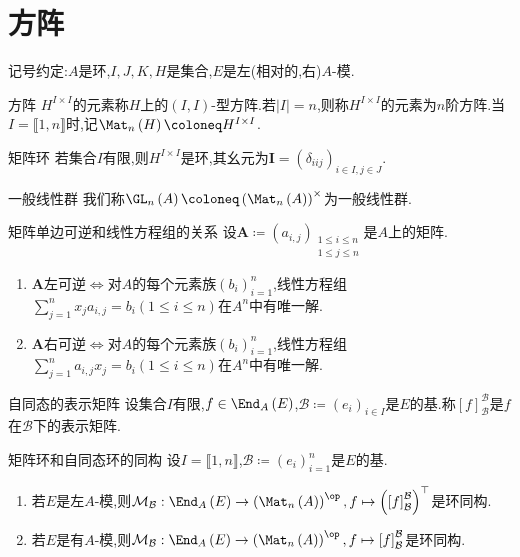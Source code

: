 \section{方阵}

记号约定:$A$是环,$I,J,K,H$是集合,$E$是左(相对的,右)$A$-模.

\begin{definition}{方阵}{}
	$H^{I\times I}$的元素称$H$上的$\left(I,I\right)$-型方阵.若$\left|I\right|=n$,则称$H^{I\times I}$的元素为$n$阶方阵.当$I=\llbracket 1,n\rrbracket$时,记$\Mat_{n}\left(H\right)\coloneq H^{I\times I}$.
\end{definition}

\begin{proposition}{矩阵环}{}
	若集合$I$有限,则$H^{I\times I}$是环,其幺元为$\boldsymbol{I}=\left(\delta_{iij}\right)_{i\in I,j\in J}$.
\end{proposition}

\begin{definition}{一般线性群}{}
	我们称$\GL_{n}\left(A\right)\coloneq\left(\Mat_{n}\left(A\right)\right)^{\times}$为一般线性群.
\end{definition}

\begin{proposition}{矩阵单边可逆和线性方程组的关系}{}
	设$\boldsymbol{A}\coloneq\left(a_{i,j}\right)_{\substack{1\leq i\leq n\\1\leq j\leq n}}$是$A$上的矩阵.
	\begin{enumerate}
		\item $\boldsymbol{A}$左可逆$\iff$对$A$的每个元素族$\left(b_{i}\right)_{i=1}^{n}$,线性方程组$\sum\limits_{j=1}^{n}x_{j}a_{i,j}=b_{i}\left(1\leq i\leq n\right)$在$A^{n}$中有唯一解.
		\item $\boldsymbol{A}$右可逆$\iff$对$A$的每个元素族$\left(b_{i}\right)_{i=1}^{n}$,线性方程组$\sum\limits_{j=1}^{n}a_{i,j}x_{j}=b_{i}\left(1\leq i\leq n\right)$在$A^{n}$中有唯一解.
	\end{enumerate}
\end{proposition}

\begin{definition}{自同态的表示矩阵}{}
	设集合$I$有限,$f\in\End_{A}\left(E\right)$,$\mathcal{B}\coloneq\left(e_{i}\right)_{i\in I}$是$E$的基.称$\left[f\right]_{\mathcal{B}}^{\mathcal{B}}$是$f$在$\mathcal{B}$下的表示矩阵.
\end{definition}

\begin{proposition}{矩阵环和自同态环的同构}{}
	设$I=\llbracket 1,n\rrbracket$,$\mathcal{B}\coloneq\left(e_{i}\right)_{i=1}^{n}$是$E$的基.
	\begin{enumerate}
		\item 若$E$是左$A$-模,则$\mathcal{M}_{\mathcal{B}}:\End_{A}\left(E\right)\to\left(\Mat_{n}\left(A\right)\right)^{\op},f\mapsto\left(\left[f\right]_{\mathcal{B}}^{\mathcal{B}}\right)^{\top}$是环同构.
		\item 若$E$是有$A$-模,则$\mathcal{M}_{\mathcal{B}}:\End_{A}\left(E\right)\to\left(\Mat_{n}\left(A\right)\right)^{\op},f\mapsto\left[f\right]_{\mathcal{B}}^{\mathcal{B}}$是环同构.
	\end{enumerate}
\end{proposition}

